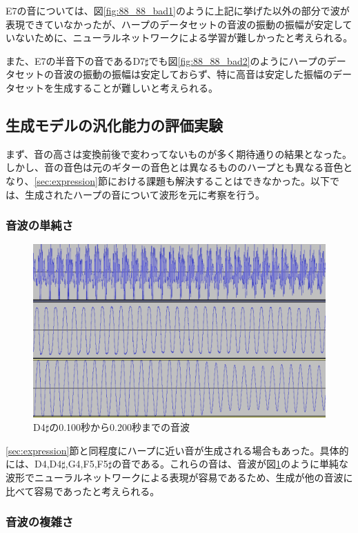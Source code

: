 E7の音については、図\ref{fig:88_88_bad1}のように上記に挙げた以外の部分で波が表現できていなかったが、ハープのデータセットの音波の振動の振幅が安定していないために、ニューラルネットワークによる学習が難しかったと考えられる。

また、E7の半音下の音であるD7$\sharp$でも図\ref{fig:88_88_bad2}のようにハープのデータセットの音波の振動の振幅は安定しておらず、特に高音は安定した振幅のデータセットを生成することが難しいと考えられる。

\subsection{生成モデルの汎化能力の評価実験}

まず、音の高さは変換前後で変わってないものが多く期待通りの結果となった。しかし、音の音色は元のギターの音色とは異なるもののハープとも異なる音色となり、\ref{sec:expression}節における課題も解決することはできなかった。以下では、生成されたハープの音について波形を元に考察を行う。

\subsubsection{音波の単純さ}

\begin{figure}[t]
\begin{center}
\includegraphics[width=0.7\hsize]{figure/66_22_det/d4s_0100_0200.png}
\caption{D4$\sharp$の0.100秒から0.200秒までの音波}
\label{fig:66_22_near}
\end{center}
\end{figure}

\ref{sec:expression}節と同程度にハープに近い音が生成される場合もあった。具体的には、D4,D4$\sharp$,G4,F5,F5$\sharp$の音である。これらの音は、音波が図\ref{fig:66_22_near}のように単純な波形でニューラルネットワークによる表現が容易であるため、生成が他の音波に比べて容易であったと考えられる。

\subsubsection{音波の複雑さ}

